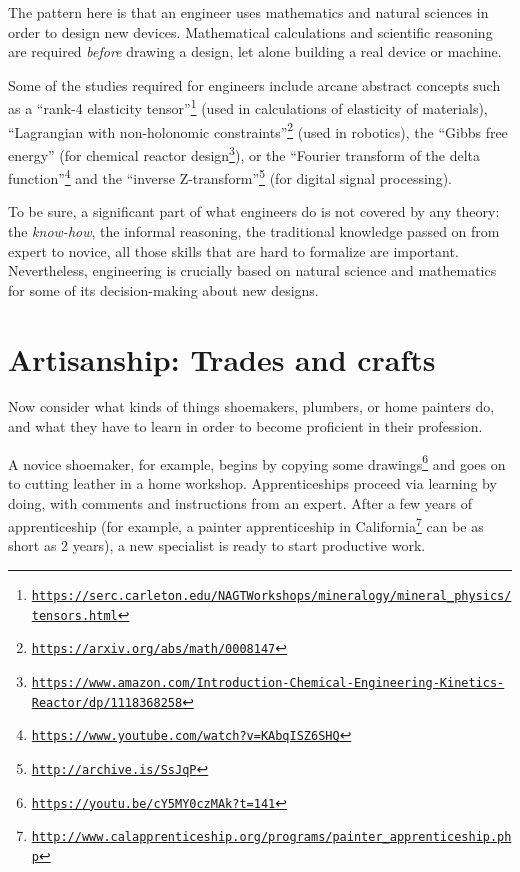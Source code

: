 The pattern here is that an engineer uses mathematics and natural
sciences in order to design new devices. Mathematical calculations
and scientific reasoning are required \emph{before} drawing a design,
let alone building a real device or machine.

Some of the studies required for engineers include arcane abstract
concepts such as a ``rank-4 elasticity tensor''\footnote{\texttt{\href{https://serc.carleton.edu/NAGTWorkshops/mineralogy/mineral_physics/tensors.html}{https://serc.carleton.edu/NAGTWorkshops/mineralogy/mineral\_physics/tensors.html}}}
(used in calculations of elasticity of materials), ``Lagrangian with
non-holonomic constraints''\footnote{\texttt{\href{https://arxiv.org/abs/math/0008147}{https://arxiv.org/abs/math/0008147}}}
(used in robotics), the ``Gibbs free energy'' (for chemical reactor
design\footnote{\texttt{\href{https://www.amazon.com/Introduction-Chemical-Engineering-Kinetics-Reactor/dp/1118368258}{https://www.amazon.com/Introduction-Chemical-Engineering-Kinetics-Reactor/dp/1118368258}}}),
or the ``Fourier transform of the delta function''\footnote{\texttt{\href{https://www.youtube.com/watch?v=KAbqISZ6SHQ}{https://www.youtube.com/watch?v=KAbqISZ6SHQ}}}
and the ``inverse Z-transform''\footnote{\texttt{\href{http://archive.is/SsJqP}{http://archive.is/SsJqP}}}
(for digital signal processing).

To be sure, a significant part of what engineers do is not covered
by any theory: the \emph{know-how}, the informal reasoning, the traditional
knowledge passed on from expert to novice,  \textemdash{} all those
skills that are hard to formalize are important. Nevertheless, engineering
is crucially based on natural science and mathematics for some of
its decision-making about new designs.

\section{Artisanship: Trades and crafts }

Now consider what kinds of things shoemakers, plumbers, or home painters
do, and what they have to learn in order to become proficient in their
profession.

A novice shoemaker, for example, begins by copying some drawings\footnote{\texttt{\href{https://youtu.be/cY5MY0czMAk?t=141}{https://youtu.be/cY5MY0czMAk?t=141}}}
and goes on to cutting leather in a home workshop. Apprenticeships
proceed via learning by doing, with comments and instructions from
an expert. After a few years of apprenticeship (for example, a painter
apprenticeship in California\footnote{\texttt{\href{http://www.calapprenticeship.org/programs/painter_apprenticeship.php}{http://www.calapprenticeship.org/programs/painter\_apprenticeship.php}}}
can be as short as 2 years), a new specialist is ready to start productive
work. 

